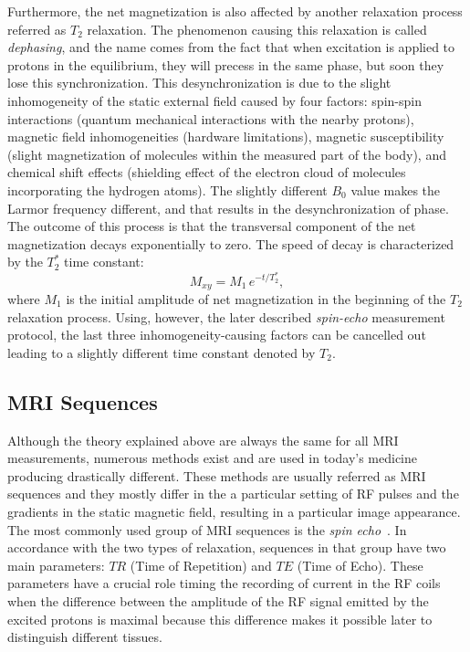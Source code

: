 Furthermore, the net magnetization is also affected by another relaxation process referred as $T_2$ relaxation. The phenomenon causing this relaxation is called \textit{dephasing}, and the name comes from the fact that when excitation is applied to protons in the equilibrium, they will precess in the same phase, but soon they lose this synchronization. This desynchronization is due to the slight inhomogeneity of the static external field caused by four factors: spin-spin interactions (quantum mechanical interactions with the nearby protons), magnetic field inhomogeneities (hardware limitations), magnetic susceptibility (slight magnetization of molecules within the measured part of the body), and chemical shift effects (shielding effect of the electron cloud of molecules incorporating the hydrogen atoms). The slightly different $B_0$ value makes the Larmor frequency different, and that results in the desynchronization of phase. The outcome of this process is that the transversal component of the net magnetization decays exponentially to zero. The speed of decay is characterized by the $T_2^*$ time constant:
\[M_{xy} = M_1\,e^{-t/T_2^*},\]
where $M_1$ is the initial amplitude of net magnetization in the beginning of the $T_2$ relaxation process. Using, however, the later described \textit{spin-echo} measurement protocol, the last three inhomogeneity-causing factors can be cancelled out leading to a slightly different time constant denoted by $T_2$.

\subsection{MRI Sequences}
Although the theory explained above are always the same for all MRI measurements, numerous methods exist and are used in today's medicine producing drastically different. These methods are usually referred as MRI sequences and they mostly differ in the a particular setting of RF pulses and the gradients in the static magnetic field, resulting in a particular image appearance. The most commonly used group of MRI sequences is the \textit{spin echo}~\cite{hahn_spin_1950}. In accordance with the two types of relaxation, sequences in that group have two main parameters: $TR$ (Time of Repetition) and $TE$ (Time of Echo). These parameters have a crucial role timing the recording of current in the RF coils when the difference between the amplitude of the RF signal emitted by the excited protons is maximal because this difference makes it possible later to distinguish different tissues.

